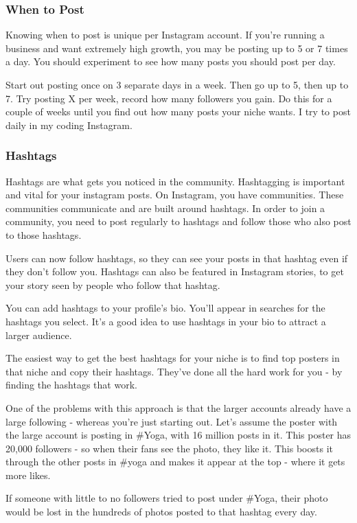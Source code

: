 \documentclass{article}
\begin{document}
\subsubsection{When to Post}
Knowing when to post is unique per Instagram account. If you're running
a business and want extremely high growth, you may be posting up to 5 or
7 times a day. You should experiment to see how many posts you should
post per day.

Start out posting once on 3 separate days in a week. Then go up to 5,
then up to 7. Try posting X per week, record how many followers you
gain. Do this for a couple of weeks until you find out how many posts
your niche wants. I try to post daily in my coding Instagram.
\subsubsection{Hashtags}
Hashtags are what gets you noticed in the community. Hashtagging is
important and vital for your instagram posts. On Instagram, you have
communities. These communities communicate and are built around
hashtags. In order to join a community, you need to post regularly to
hashtags and follow those who also post to those hashtags.

Users can now follow hashtags, so they can see your posts in that
hashtag even if they don't follow you. Hashtags can also be featured in
Instagram stories, to get your story seen by people who follow that
hashtag.

You can add hashtags to your profile's bio. You'll appear in searches
for the hashtags you select. It's a good idea to use hashtags in your
bio to attract a larger audience.

The easiest way to get the best hashtags for your niche is to find top
posters in that niche and copy their hashtags. They've done all the hard
work for you - by finding the hashtags that work.

One of the problems with this approach is that the larger accounts
already have a large following - whereas you're just starting out. Let's
assume the poster with the large account is posting in \#Yoga, with 16
million posts in it. This poster has 20,000 followers - so when their
fans see the photo, they like it. This boosts it through the other posts
in \#yoga and makes it appear at the top - where it gets more likes.

If someone with little to no followers tried to post under \#Yoga, their
photo would be lost in the hundreds of photos posted to that hashtag
every day.
\end{document}
